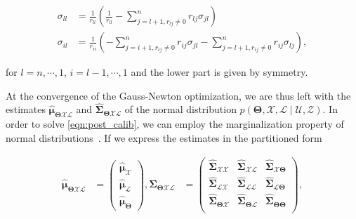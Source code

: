 \begin{equation}\label{eqn:covariance_QR}
  \begin{aligned}
  \sigma_{ll} &= \frac{1}{r_{ll}}(\frac{1}{r_{ll}} -
    \sum_{j = l + 1, r_{lj}\neq 0}^n r_{lj}\sigma_{jl})\\
  \sigma_{il} &= \frac{1}{r_{ii}}
    (-\sum_{j = i + 1, r_{ij}\neq 0}^n r_{ij}\sigma_{jl} -
    \sum_{j = l + 1, r_{ij}\neq 0}^n r_{ij}\sigma_{lj}),
  \end{aligned}
\end{equation}

\noindent for $l=n,\cdots,1$, $i=l-1,\cdots,1$ and the lower part is given by
symmetry.

At the convergence of the Gauss-Newton optimization, we are thus left with the
estimates $\hat{\boldsymbol{\mu}}_{\boldsymbol{\Theta}\mathcal{X}\mathcal{L}}$
and $\hat{\boldsymbol{\Sigma}}_{\boldsymbol{\Theta}\mathcal{X}\mathcal{L}}$ of
the normal distribution $p(\boldsymbol{\Theta}, \mathcal{X},\mathcal{L}
\mid\mathcal{U},\mathcal{Z})$. In order to solve \eqref{eqn:post_calib}, we can
employ the marginalization property of normal
distributions~\cite{bishop06pattern}. If we express the estimates in the
partitioned form

\begin{equation}\label{eqn:partitioned_estimates}
  \begin{aligned}
  \hat{\boldsymbol{\mu}}_{\boldsymbol{\Theta}\mathcal{X}\mathcal{L}} &=
    \begin{pmatrix}
    \hat{\boldsymbol{\mu}}_{\mathcal{X}}\\
    \hat{\boldsymbol{\mu}}_{\mathcal{L}}\\
    \hat{\boldsymbol{\mu}}_{\boldsymbol{\Theta}}
    \end{pmatrix},
  \hat{\boldsymbol{\Sigma}}_{\boldsymbol{\Theta}\mathcal{X}\mathcal{L}} &=
    \begin{pmatrix}
    \hat{\boldsymbol{\Sigma}}_{\mathcal{X}\mathcal{X}}&
    \hat{\boldsymbol{\Sigma}}_{\mathcal{X}\mathcal{L}}&
    \hat{\boldsymbol{\Sigma}}_{\mathcal{X}\boldsymbol{\Theta}}\\
    \hat{\boldsymbol{\Sigma}}_{\mathcal{L}\mathcal{X}}&
    \hat{\boldsymbol{\Sigma}}_{\mathcal{L}\mathcal{L}}&
    \hat{\boldsymbol{\Sigma}}_{\mathcal{L}\boldsymbol{\Theta}}\\
    \hat{\boldsymbol{\Sigma}}_{\boldsymbol{\Theta}\mathcal{X}}&
    \hat{\boldsymbol{\Sigma}}_{\boldsymbol{\Theta}\mathcal{L}}&
    \hat{\boldsymbol{\Sigma}}_{\boldsymbol{\Theta}\boldsymbol{\Theta}}\\
    \end{pmatrix},
  \end{aligned}
\end{equation}

